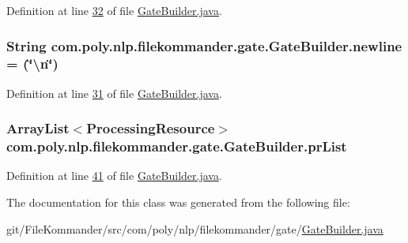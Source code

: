 Definition at line \hyperlink{L32}{32} of file \hyperlink{}{Gate\-Builder.\-java}.

\hypertarget{classcom_1_1poly_1_1nlp_1_1filekommander_1_1gate_1_1_gate_builder_a6a44fefbc1299f76aca84b037f79bd35}{
\subsubsection[{newline}]{\setlength{\rightskip}{0pt plus 5cm}String com.\-poly.\-nlp.\-filekommander.\-gate.\-Gate\-Builder.\-newline = (\char`\"{}\textbackslash{}n\char`\"{})\hspace{0.3cm}{\ttfamily [static]}}}\label{classcom_1_1poly_1_1nlp_1_1filekommander_1_1gate_1_1_gate_builder_a6a44fefbc1299f76aca84b037f79bd35}


Definition at line \hyperlink{L31}{31} of file \hyperlink{}{Gate\-Builder.\-java}.

\hypertarget{classcom_1_1poly_1_1nlp_1_1filekommander_1_1gate_1_1_gate_builder_a4e56ddc3afefb48e751266e1e6449b7f}{
\subsubsection[{pr\-List}]{\setlength{\rightskip}{0pt plus 5cm}Array\-List$<${\bf Processing\-Resource}$>$ com.\-poly.\-nlp.\-filekommander.\-gate.\-Gate\-Builder.\-pr\-List\hspace{0.3cm}{\ttfamily [private]}}}\label{classcom_1_1poly_1_1nlp_1_1filekommander_1_1gate_1_1_gate_builder_a4e56ddc3afefb48e751266e1e6449b7f}


Definition at line \hyperlink{L41}{41} of file \hyperlink{}{Gate\-Builder.\-java}.



The documentation for this class was generated from the following file\-:\begin{DoxyCompactItemize}
\item 
git/\-File\-Kommander/src/com/poly/nlp/filekommander/gate/\hyperlink{_gate_builder_8java}{Gate\-Builder.\-java}\end{DoxyCompactItemize}

